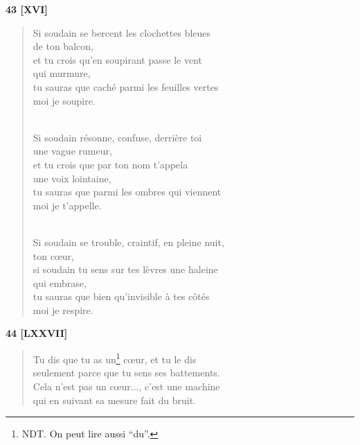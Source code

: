 \documentclass[a4paper,11pt]{book}
\begin{document}
\bigskip

\begin{center} {\bf 43 [XVI]} \end{center}

\begin{verse}
Si soudain se bercent les clochettes bleues \\
de ton balcon, \\
et tu crois qu'en soupirant passe le vent \\
qui murmure, \\
tu sauras que caché parmi les feuilles vertes \\
moi je soupire. \\ \

Si soudain résonne, confuse, derrière toi \\
une vague rumeur, \\
et tu crois que par ton nom t'appela \\
une voix lointaine, \\
tu sauras que parmi les ombres qui viennent \\
moi je t'appelle. \\ \

Si soudain se trouble, craintif, en pleine nuit, \\
ton c{\oe}ur, \\
si soudain tu sens sur tes lèvres une haleine \\
qui embrase, \\
tu sauras que bien qu'invisible à tes côtés \\
moi je respire. \\
\end{verse}

\bigskip

\begin{center} {\bf 44 [LXXVII]} \end{center}

\begin{verse}
Tu dis que tu as un\footnote{NDT. On peut lire aussi ``du''.} c{\oe}ur, et tu le dis \\
seulement parce que tu sens ses battements. \\
Cela n'est pas un c{\oe}ur..., c'est une machine \\
qui en suivant sa mesure fait du bruit. \\
\end{verse}
\end{document}
